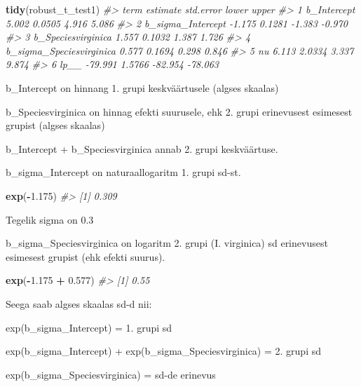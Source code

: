 \documentclass[]{book}
\newenvironment{Shaded}{\begin{snugshade}}{\end{snugshade}}
\newcommand{\CommentTok}[1]{\textcolor[rgb]{0.56,0.35,0.01}{\textit{#1}}}
\newcommand{\FloatTok}[1]{\textcolor[rgb]{0.00,0.00,0.81}{#1}}
\newcommand{\KeywordTok}[1]{\textcolor[rgb]{0.13,0.29,0.53}{\textbf{#1}}}
\newcommand{\NormalTok}[1]{#1}
\newcommand{\OperatorTok}[1]{\textcolor[rgb]{0.81,0.36,0.00}{\textbf{#1}}}
\newcommand{\StringTok}[1]{\textcolor[rgb]{0.31,0.60,0.02}{#1}}
\begin{document}
\begin{Shaded}
\begin{Highlighting}[]
\KeywordTok{tidy}\NormalTok{(robust_t_test1)}
\CommentTok{#>                       term estimate std.error   lower   upper}
\CommentTok{#> 1              b_Intercept    5.002    0.0505   4.916   5.086}
\CommentTok{#> 2        b_sigma_Intercept   -1.175    0.1281  -1.383  -0.970}
\CommentTok{#> 3       b_Speciesvirginica    1.557    0.1032   1.387   1.726}
\CommentTok{#> 4 b_sigma_Speciesvirginica    0.577    0.1694   0.298   0.846}
\CommentTok{#> 5                       nu    6.113    2.0334   3.337   9.874}
\CommentTok{#> 6                     lp__  -79.991    1.5766 -82.954 -78.063}
\end{Highlighting}
\end{Shaded}

b\_Intercept on hinnang 1. grupi keskväärtusele (algses skaalas)

b\_Speciesvirginica on hinnag efekti suurusele, ehk 2. grupi erinevusest esimesest grupist (algses skaalas)

b\_Intercept + b\_Speciesvirginica annab 2. grupi keskväärtuse.

b\_sigma\_Intercept on naturaallogaritm 1. grupi sd-st.

\begin{Shaded}
\begin{Highlighting}[]
\KeywordTok{exp}\NormalTok{(}\OperatorTok{-}\FloatTok{1.175}\NormalTok{)}
\CommentTok{#> [1] 0.309}
\end{Highlighting}
\end{Shaded}

Tegelik sigma on 0.3

b\_sigma\_Speciesvirginica on logaritm 2. grupi (I. virginica) sd erinevusest esimesest grupist (ehk efekti suurus).

\begin{Shaded}
\begin{Highlighting}[]
\KeywordTok{exp}\NormalTok{(}\OperatorTok{-}\FloatTok{1.175} \OperatorTok{+}\StringTok{ }\FloatTok{0.577}\NormalTok{)}
\CommentTok{#> [1] 0.55}
\end{Highlighting}
\end{Shaded}

Seega saab algses skaalas sd-d nii:

exp(b\_sigma\_Intercept) = 1. grupi sd

exp(b\_sigma\_Intercept) + exp(b\_sigma\_Speciesvirginica) = 2. grupi sd

exp(b\_sigma\_Speciesvirginica) = sd-de erinevus
\end{document}

